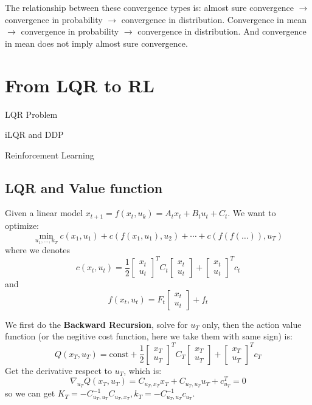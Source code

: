 \documentclass[10pt]{elegantbook}
\begin{document}
The relationship between these convergence types is:
almost sure convergence $\rightarrow$ convergence in probability $\rightarrow$ convergence in distribution.
Convergence in mean $\rightarrow$ convergence in probability $\rightarrow$ convergence in distribution.
And convergence in mean does not imply almost sure convergence.



\chapter{From LQR to RL}

\begin{introduction}
    \item LQR Problem
    \item iLQR and DDP
    \item Reinforcement Learning
\end{introduction}

\section{LQR and Value function}

Given a linear model $x_{t+1} = f(x_t, u_k) = A_t x_t + B_t u_t + C_t$. We want to optimize:
\[ \min_{u_1, \ldots, u_T} c(x_1, u_1) + c(f(x_1, u_1), u_2) + \cdots + c(f(f(\ldots)), u_T) \]
where we denotes 
\[ c(x_t, u_t) = \frac{1}{2} 
\begin{bmatrix}
    x_t \\ 
    u_t
\end{bmatrix}^T C_t 
\begin{bmatrix}
    x_t \\ 
    u_t
\end{bmatrix}
+
\begin{bmatrix}
    x_t \\ 
    u_t
\end{bmatrix}^T c_t
\]
and 
\[ f(x_t, u_t) 
= F_t
\begin{bmatrix}
    x_t \\ 
    u_t
\end{bmatrix}
+ f_t
\]

We first do the \textbf{Backward Recursion}, solve for $u_T$ only, then the action value function (or the negitive cost function, here
we take them with same sign) is:
\[ Q(x_T, u_T) = \text{const} +
\frac{1}{2} 
\begin{bmatrix}
    x_T \\ 
    u_T
\end{bmatrix}^T C_T
\begin{bmatrix}
    x_T \\ 
    u_T
\end{bmatrix} + 
\begin{bmatrix}
    x_T \\ 
    u_T
\end{bmatrix}^T c_T
\]
Get the derivative respect to $u_T$, which is:
\[ \nabla_{u_T} Q(x_T, u_T) = C_{u_T, x_T}x_T + C_{u_T,u_T}u_T + c_{u_T}^T = 0 \]
so we can get $K_T = -C_{u_T,u_T}^{-1}C_{u_T, x_T}, k_T = -C_{u_T,u_T}^{-1}c_{u_T}$.
\end{document}
